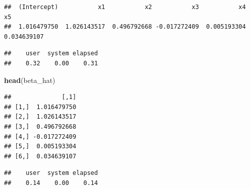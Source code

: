 \documentclass[
]{book}
\newenvironment{Shaded}{\begin{snugshade}}{\end{snugshade}}
\newcommand{\CommentTok}[1]{\textcolor[rgb]{0.56,0.35,0.01}{\textit{#1}}}
\newcommand{\KeywordTok}[1]{\textcolor[rgb]{0.13,0.29,0.53}{\textbf{#1}}}
\newcommand{\NormalTok}[1]{#1}
\newcommand{\OperatorTok}[1]{\textcolor[rgb]{0.81,0.36,0.00}{\textbf{#1}}}
\newcommand{\StringTok}[1]{\textcolor[rgb]{0.31,0.60,0.02}{#1}}
\begin{document}
\begin{verbatim}
##  (Intercept)           x1           x2           x3           x4           x5 
##  1.016479750  1.026143517  0.496792668 -0.017272409  0.005193304  0.034639107
\end{verbatim}

\begin{Shaded}
\end{Shaded}

\begin{verbatim}
##    user  system elapsed 
##    0.32    0.00    0.31
\end{verbatim}

\begin{Shaded}
\begin{Highlighting}[]
    \KeywordTok{head}\NormalTok{(beta_hat)}
\end{Highlighting}
\end{Shaded}

\begin{verbatim}
##              [,1]
## [1,]  1.016479750
## [2,]  1.026143517
## [3,]  0.496792668
## [4,] -0.017272409
## [5,]  0.005193304
## [6,]  0.034639107
\end{verbatim}

\begin{Shaded}
\end{Shaded}

\begin{verbatim}
##    user  system elapsed 
##    0.14    0.00    0.14
\end{verbatim}
\end{document}
